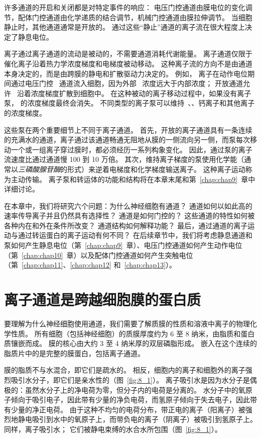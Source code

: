 许多通道的开启和关闭都是对特定事件的响应：
电压门控通道由膜电位的变化调节，配体门控通道由化学递质的结合调节，机械门控通道由膜拉伸调节。
当细胞静止时，其他通道通常是开放的。
通过这些“静止”通道的离子流在很大程度上决定了静息电位。


离子通过离子通道的流动是被动的，不需要通道消耗代谢能量。
离子通道仅限于催化离子沿着热力学浓度梯度和电梯度被动移动。
这种离子流的方向不是由通道本身决定的，而是由跨膜的静电和扩散驱动力决定的。
例如， 离子在动作电位期间通过电压门控~ 通道流入细胞，因为外部~ 浓度远大于内部浓度；
开放通道允许~ 沿着浓度梯度扩散到细胞中。
在这种被动的离子移动过程中，如果没有离子泵， 的浓度梯度最终会消失。
不同类型的离子泵可以维持~、、钙离子和其他离子的浓度梯度。


这些泵在两个重要细节上不同于离子通道。
首先，开放的离子通道具有一条连续的充满水的通道，离子通过该通道畅通无阻地从膜的一侧流向另一侧，而泵每次移动一个或一组离子穿过膜时，都必须经历一系列构象变化。
因此，通过泵的离子流速度比通过通道慢 100 到 10 万倍。
其次，维持离子梯度的泵使用化学能（通常以\textit{三磷酸腺苷酶}的形式）来逆着电梯度和化学梯度输送离子。
这种离子运动称为主动传输。
离子泵和转运体的功能和结构将在本章末尾和第~\ref{chap:chap9}~章中详细讨论。


在本章中，我们将研究六个问题：为什么神经细胞有通道？
通道如何以如此高的速率传导离子并且仍然具有选择性？ 
通道是如何门控的？
这些通道的特性如何被各种内在和外在条件所改变？
通道结构如何解释功能？
最后，通过通道的离子运动与通过转运蛋白的离子运动有何不同？
在后续章节中，我们将考虑静息通道和泵如何产生静息电位（第~\ref{chap:chap9}~章）、电压门控通道如何产生动作电位（第~\ref{chap:chap10}~章）以及配体门控通道如何产生突触电位（第~\ref{chap:chap11}、\ref{chap:chap12} 和~\ref{chap:chap13}）。



\section{离子通道是跨越细胞膜的蛋白质}

要理解为什么神经细胞使用通道，我们需要了解质膜的性质和溶液中离子的物理化学性质。
所有细胞（包括神经细胞）的质膜厚度约为 6 至 8 纳米，由脂质和蛋白质镶嵌而成。
膜的核心由大约 3 至 4 纳米厚的双层磷脂形成。
嵌入在这个连续的脂质片中的是完整的膜蛋白，包括离子通道。


膜的脂质不与水混合，即它们是疏水的。
相反，细胞内的离子和细胞外的离子强烈吸引水分子，即它们是亲水性的（图~\ref{fig:8_1}）。
离子吸引水是因为水分子是偶极的：虽然水分子上的净电荷为零，但分子内的电荷是分离的。
水分子中的氧原子倾向于吸引电子，因此带有少量的净负电荷，而氢原子倾向于失去电子，因此带有少量的净正电荷。
由于这种不均匀的电荷分布，带正电的离子（阳离子）被强烈地静电吸引到水中的氧原子上，而带负电的离子（阴离子）被吸引到氢原子上。
同样，离子吸引水；
它们被静电束缚的水合水所包围（图~\ref{fig:8_1}）。


